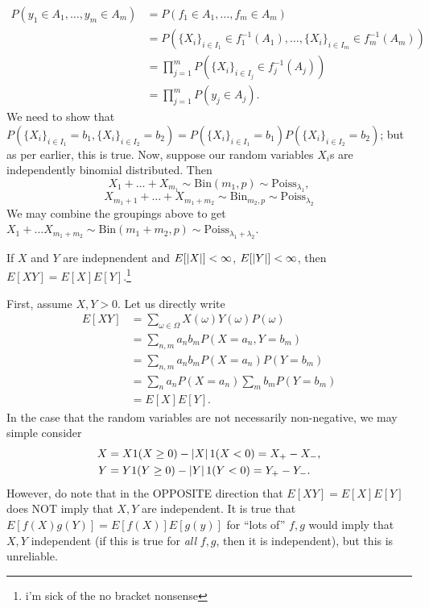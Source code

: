 \begin{align*}
    P(y_1 \in A_1, \dots, y_m \in A_m) &= P(f_1 \in A_1, \dots, f_m \in A_m) \\
    &= P(\{X_i\}_{i \in I_1} \in f_1^{-1}(A_1), \dots, \{X_i\}_{i \in I_m} \in f_m^{-1}(A_m)) \\
    &= \prod_{j=1}^m P(\{X_i\}_{i \in I_j} \in f_j^{-1}(A_j)) \\
    &= \prod_{j=1}^m P(y_j \in A_j).
\end{align*}
We need to show that $P(\{X_i\}_{i \in I_1} = b_1, \{X_i\}_{i \in I_2} = b_2) = P(\{X_i\}_{i \in I_1} = b_1)P(\{X_i\}_{i \in I_2} = b_2)$; but as per earlier, this is true.
\medskip\newline
Now, suppose our random variables $X_i$s are independently binomial distributed. Then
\[ X_1 + \dots + X_{m_1} \sim \mathrm{Bin}(m_1, p) \sim \mathrm{Poiss}_{\lambda_1}, \tag{$\lambda_1 = pm_1$} \]
\[ X_{m_1 + 1} + \dots + X_{m_1 + m_2} \sim \mathrm{Bin}_{m_2, p} \sim \mathrm{Poiss}_{\lambda_2} \tag{$\lambda_2 = pm_2$} \]
We may combine the groupings above to get $X_1 + \dots X_{m_1 + m_2} \sim \mathrm{Bin}(m_1 + m_2, p) \sim \mathrm{Poiss}_{\lambda_1 + \lambda_2}$.
\begin{simplelemma}
    If $X$ and $Y$ are indepnendent and $E[\left\lvert X \right\rvert] < \infty$, $E[\left\lvert Y \right\rvert] < \infty$, then $E[XY] = E[X] E[Y]$.\footnote{i'm sick of the no bracket nonsense}
\end{simplelemma}
\noindent First, assume $X, Y > 0$. Let us directly write
\begin{align*}
    E[XY] &= \sum_{\omega \in \Omega} X(\omega) Y(\omega) P(\omega) \\
    &= \sum_{n, m} a_n b_m P(X = a_n, Y = b_m) \\
    &= \sum_{n, m} a_n b_m P(X = a_n) P(Y = b_m) \\
    &= \sum_{n} a_n P(X = a_n) \sum_m b_m P(Y = b_m) \\
    &= E[X] E[Y].
\end{align*}
In the case that the random variables are not necessarily non-negative, we may simple consider
\begin{align*}
    X &= X 1(X \geq 0) - \left\lvert X \right\rvert 1(X < 0) = X_+ - X_-, \\
    Y &= Y 1(Y \geq 0) - \left\lvert Y \right\rvert 1(Y < 0) = Y_+ - Y_-.
\end{align*}
However, do note that in the OPPOSITE direction that $E[XY] = E[X] E[Y]$ does NOT imply that $X, Y$ are independent. It is true that $E[f(X) g(Y)] = E[f(X)] E[g(y)]$ for ``lots of'' $f, g$ would imply that $X, Y$ independent (if this is true for \textit{all} $f, g$, then it is independent), but this is unreliable.
